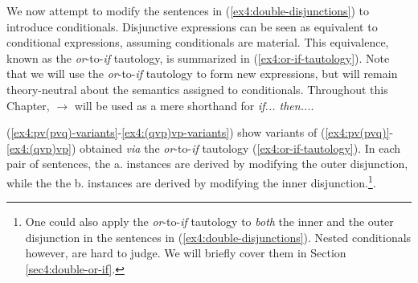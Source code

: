 We now attempt to modify the sentences in (\ref{ex4:double-disjunctions}) to introduce conditionals. Disjunctive expressions can be seen as equivalent to conditional expressions, assuming conditionals are material. This equivalence, known as the \textit{or}-to-\textit{if} tautology, is summarized in (\ref{ex4:or-if-tautology}). Note that we will use the \textit{or}-to-\textit{if} tautology to form new expressions, but will remain theory-neutral about the semantics assigned to conditionals. Throughout this Chapter, $\rightarrow$ will be used as a mere shorthand for \textit{if... then...}.

\begin{exe}
	\label{ex4:or-if-tautology}
\end{exe}

(\ref{ex4:pv(pvq)-variants}-\ref{ex4:(qvp)vp-variants}) show variants of (\ref{ex4:pv(pvq)}-\ref{ex4:(qvp)vp}) obtained \textit{via} the \textit{or}-to-\textit{if} tautology (\ref{ex4:or-if-tautology}). In each pair of sentences, the a. instances are derived by modifying the outer disjunction, while the the b. instances are derived by modifying the inner disjunction.\footnote{One could also apply the \textit{or}-to-\textit{if} tautology to \textit{both} the inner and the outer disjunction in the sentences in (\ref{ex4:double-disjunctions}). Nested conditionals however, are hard to judge. We will briefly cover them in Section \ref{sec4:double-or-if}.}. 


